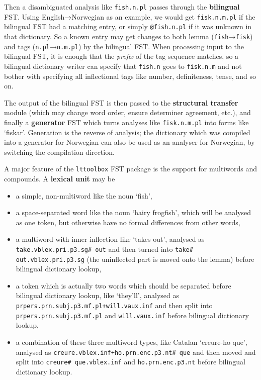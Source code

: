 \documentclass[10pt, a4paper]{article}
\newcommand{\ana}[1]{\texttt{#1}}
\newcommand{\f}[1]{`#1'}
\newcommand{\tool}[1]{\texttt{#1}}
\begin{document}
Then a disambiguated analysis like \ana{fish.n.pl} passes through the
\textbf{bilingual} FST. Using English→Norwegian as an example, we
would get \ana{fisk.n.m.pl} if the bilingual FST had a matching entry,
or simply \ana{@fish.n.pl} if it was unknown in that dictionary. So a
known entry may get changes to both lemma (\ana{fish}→\ana{fisk}) and tags
(\ana{n.pl}→\ana{n.m.pl}) by the bilingual FST. When processing input to
the bilingual FST, it is enough that the \emph{prefix} of the tag
sequence matches, so a bilingual dictionary writer can specify that
\ana{fish.n} goes to \ana{fisk.n.m} and not bother with specifying all
inflectional tags like number, definiteness, tense, and so on.

The output of the bilingual FST is then passed to the
\textbf{structural transfer} module (which may change word order,
ensure determiner agreement, etc.), and finally a \textbf{generator}
FST which turns analyses like \ana{fisk.n.m.pl} into forms like
\f{fiskar}. Generation is the reverse of analysis; the dictionary
which was compiled into a generator for Norwegian can also be used as
an analyser for Norwegian, by switching the compilation direction.

A major feature of the \tool{lttoolbox} FST package is the support
for multiwords and compounds. A \textbf{lexical unit} may be 
\begin{itemize}
\item a simple, non-multiword like the noun \f{fish},
\item a space-separated word like the noun \f{hairy frogfish}, which
  will be analysed as one token, but otherwise have no formal
  differences from other words,
\item a multiword with inner inflection like \f{takes out}, analysed
  as \ana{take.vblex.pri.p3.sg\# out} and then turned into \ana{take\#
    out.vblex.pri.p3.sg} (the uninflected part is moved onto the
  lemma) before bilingual dictionary lookup,
\item a token which is actually two words which should be separated
  before bilingual dictionary lookup, like \f{they'll}, analysed as
  \ana{prpers.prn.subj.p3.mf.pl+will.vaux.inf} and then split into
  \ana{prpers.prn.subj.p3.mf.pl} and \ana{will.vaux.inf} before
  bilingual dictionary lookup,
\item a combination of these three multiword types, like Catalan
  \f{creure-ho que}, analysed as
  \ana{creure.vblex.inf+ho.prn.enc.p3.nt\# que} and then moved
  and split into \ana{creure\# que.vblex.inf} and
  \ana{ho.prn.enc.p3.nt} before bilingual dictionary lookup.
\end{itemize}
\end{document}
